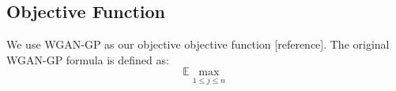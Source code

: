\subsection{Objective Function}
We use WGAN-GP as our objective objective function [reference]. The original WGAN-GP formula is defined as:
\begin{equation}
\mathbb{E}\underset{1 \leq j \leq n}{\max}
\end{equation}